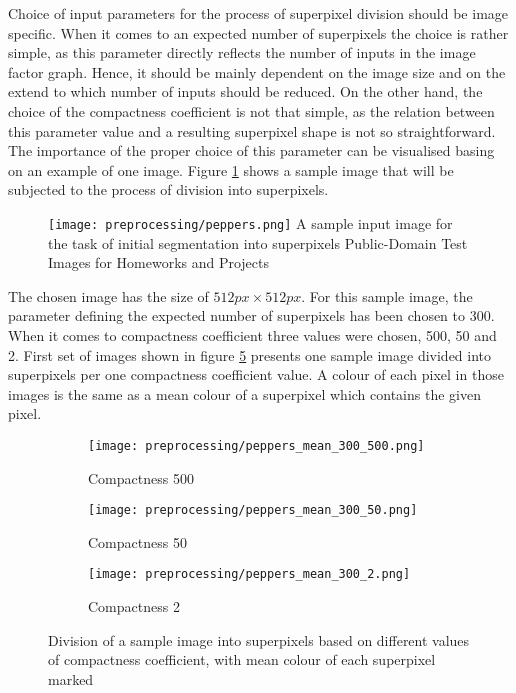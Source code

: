 Choice of input parameters for the process of superpixel division should be image specific. When it comes to an expected number of superpixels the choice is rather simple, as this parameter directly reflects the number of inputs in the image factor graph. Hence, it should be mainly dependent on the image size and on the extend to which number of inputs should be reduced. On the other hand, the choice of the compactness coefficient is not that simple, as the relation between this parameter value and a resulting superpixel shape is not so straightforward. The importance of the proper choice of this parameter can be visualised basing on an example of one image. Figure \ref{fig:peppers} shows a sample image that will be subjected to the process of division into superpixels.
\begin{figure}[h]
    \centering
    \texttt{[image: preprocessing/peppers.png]}
    \captionsource
    {A sample input image for the task of initial segmentation into superpixels}
    {Public-Domain Test Images for Homeworks and Projects \cite{peppers}}
     \label{fig:peppers}
\end{figure}
The chosen image has the size of $512px \times 512px$. For this sample image, the parameter defining the expected number of superpixels has been chosen to $300$. When it comes to compactness coefficient three values were chosen, 500, 50 and 2. First set of images shown in figure \ref{fig:peppers_mean_colour} presents one sample image divided into superpixels per one compactness coefficient value. A colour of each pixel in those images is the same as a mean colour of a superpixel which contains the given pixel.  
\begin{figure}[h]
 \centering
  \begin{subfigure}[h]{0.32\textwidth}
    \texttt{[image: preprocessing/peppers\_mean\_300\_500.png]}
    \caption{Compactness 500}
    \label{fig:peppers_mean_colour_500}
  \end{subfigure}
  \begin{subfigure}[h]{0.32\textwidth}
    \texttt{[image: preprocessing/peppers\_mean\_300\_50.png]}
    \caption{Compactness 50}
    \label{fig:peppers_mean_colour_50}
  \end{subfigure}
    \begin{subfigure}[h]{0.32\textwidth}
    \texttt{[image: preprocessing/peppers\_mean\_300\_2.png]}
    \caption{Compactness 2}
    \label{fig:peppers_mean_colour_2}
  \end{subfigure}
    \caption{Division of a sample image into superpixels based on different values of compactness coefficient, with mean colour of each superpixel marked}%
    \label{fig:peppers_mean_colour}
\end{figure}
